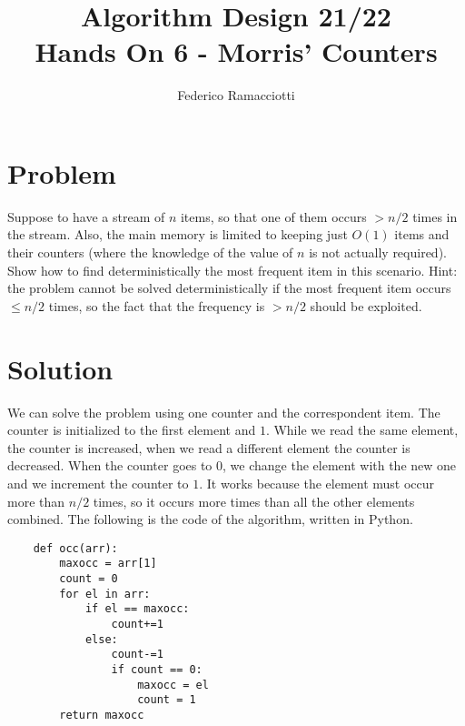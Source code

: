 \documentclass{article}
\title{\LARGE{\textbf{Algorithm Design 21/22}}\\ \vspace{1cm} Hands On 6 - Morris' Counters}
\author{Federico Ramacciotti}
\date{}
\begin{document}
\maketitle

\section{Problem}
Suppose to have a stream of $n$ items, so that one of them occurs $> n/2$ times in the stream. Also, the main memory is limited to keeping just $O(1)$ items and their counters (where the knowledge of the value of $n$ is not actually required). Show how to find deterministically the most frequent item in this scenario.
Hint: the problem cannot be solved deterministically if the most frequent item occurs $\leq n/2$ times, so the fact that the frequency is $> n/2$ should be exploited.

\section{Solution}
We can solve the problem using one counter and the correspondent item. The counter is initialized to the first element and $1$. While we read the same element, the counter is increased, when we read a different element the counter is decreased. When the counter goes to $0$, we change the element with the new one and we increment the counter to $1$. It works because the element must occur more than $n/2$ times, so it occurs more times than all the other elements combined.
The following is the code of the algorithm, written in Python.
\begin{verbatim}
    def occ(arr):
        maxocc = arr[1]
        count = 0
        for el in arr:
        	if el == maxocc:
        		count+=1
        	else:
        		count-=1
        		if count == 0:
        			maxocc = el
        			count = 1
        return maxocc
\end{verbatim}
\end{document}
